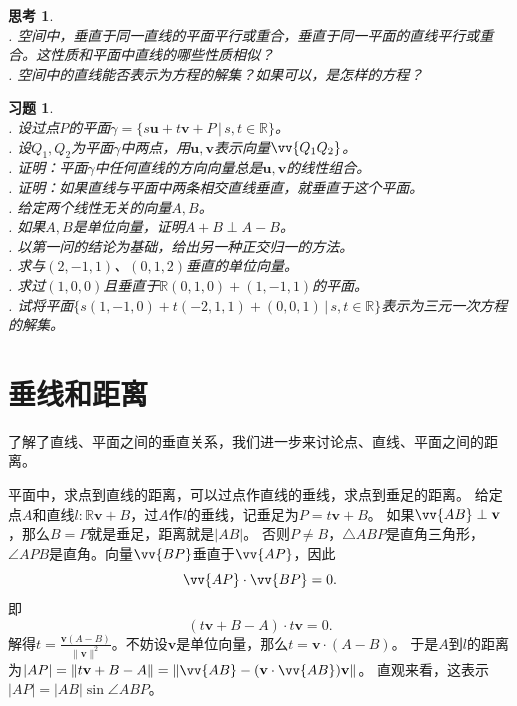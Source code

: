 \documentclass[12pt,UTF8]{ctexbook}
\newtheorem{sk}{思考}[section]
\newtheorem{xt}{习题}[section]
\begin{document}
\begin{sk}
    \mbox{} \\
    . 空间中，垂直于同一直线的平面平行或重合，垂直于同一平面的直线平行或重合。这性质和平面中直线的哪些性质相似？\\
    . 空间中的直线能否表示为方程的解集？如果可以，是怎样的方程？
\end{sk}

\begin{xt}
    \mbox{} \\ 
    . 设过点$P$的平面$\gamma = \{s\mathbf{u} + t\mathbf{v} + P \, | \, s,t\in\mathbb{R}\}$。\\
    . 设$Q_1,Q_2$为平面$\gamma$中两点，用$\mathbf{u},\mathbf{v}$表示向量$\vv{Q_1Q_2}$。\\
    . 证明：平面$\gamma$中任何直线的方向向量总是$\mathbf{u},\mathbf{v}$的线性组合。\\
    . 证明：如果直线与平面中两条相交直线垂直，就垂直于这个平面。\\     
    . 给定两个线性无关的向量$A,B$。\\
    . 如果$A,B$是单位向量，证明$A+B \perp A-B$。\\
    . 以第一问的结论为基础，给出另一种正交归一的方法。\\
    . 求与$(2,-1,1)$、$(0,1,2)$垂直的单位向量。\\
    . 求过$(1,0,0)$且垂直于$\mathbb{R}(0,1,0)+(1,-1,1)$的平面。\\
    . 试将平面$\{s(1,-1,0) + t(-2,1,1) + (0,0,1) \, | \, s,t\in\mathbb{R}\}$表示为三元一次方程的解集。
\end{xt}


\section{垂线和距离}
了解了直线、平面之间的垂直关系，我们进一步来讨论点、直线、平面之间的距离。

平面中，求点到直线的距离，可以过点作直线的垂线，求点到垂足的距离。
给定点$A$和直线$l : \mathbb{R}\mathbf{v} + B$，过$A$作$l$的垂线，记垂足为$P = t\mathbf{v} + B$。
如果$\vv{AB}\perp\mathbf{v}$，那么$B=P$就是垂足，距离就是$|AB|$。
否则$P\neq B$，$\triangle ABP$是直角三角形，$\angle APB$是直角。向量$\vv{BP}$垂直于$\vv{AP}$，因此
$$ \vv{AP}\cdot \vv{BP} = 0.$$
即
$$ (t\mathbf{v} + B - A)\cdot t\mathbf{v} = 0.$$
解得$t = \frac{\mathbf{v}(A-B)}{\|\mathbf{v}\|^2}$。不妨设$\mathbf{v}$是单位向量，那么$t=\mathbf{v}\cdot(A-B)$。
于是$A$到$l$的距离为$|AP| = \| t\mathbf{v} + B - A\| = \| \vv{AB} - (\mathbf{v}\cdot \vv{AB})\mathbf{v}\|$。
直观来看，这表示$|AP| = |AB|\sin{\angle ABP}$。
\end{document}
